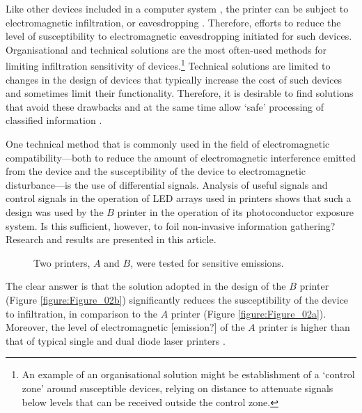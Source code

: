 \documentclass[10pt,a4paper]{article}
\begin{document}
Like other devices included in a computer system \cite{Kuhn2002,Kubiak2016a},
the printer can be subject to electromagnetic infiltration, or eavesdropping
\cite{Ketenci2015a,Kubiak2016b}. Therefore, efforts to reduce the level of
susceptibility to electromagnetic eavesdropping initiated for such devices.
Organisational and technical solutions \cite{Kubiak2006a} are the most
often-used methods for limiting infiltration
sensitivity of devices.\footnote{An example of an organisational solution
might be establishment of a `control zone' around susceptible devices,
relying on distance to attenuate signals below levels that can be received
outside the control zone.} Technical solutions are limited to changes in the
design of devices that typically increase the cost of such devices and
sometimes limit their functionality. Therefore, it is desirable to find
solutions that avoid these drawbacks and at the same time allow `safe'
processing of classified information \cite{Wasfy2011a,Goel2012a}.

One technical method that is commonly used in the field of electromagnetic
compatibility---both to reduce the amount of electromagnetic interference
emitted from the device and the susceptibility of the device to
electromagnetic disturbance---is the use of differential signals. Analysis
of useful signals and control signals \cite{Kubiak2017d} in the operation of
LED arrays
used in printers shows that such a design was used by the $B$ printer in the
operation of its photoconductor exposure system. Is this sufficient, however,
to foil non-invasive information gathering? Research and results are
presented in this article.

\begin{figure*}[!t]
    \centering
    \hfil
    \caption{Two printers, $A$ and $B$, were tested for sensitive emissions.}
    \label{figure:Figure_02}
\end{figure*}

The clear answer is that the solution adopted in the design of the $B$
printer (Figure \ref{figure:Figure_02b}) significantly reduces the
susceptibility of the device to infiltration, in comparison to the $A$
printer (Figure \ref{figure:Figure_02a}). Moreover, the level of
electromagnetic [emission?] of the $A$ printer is higher than that of
typical single and dual diode laser printers \cite{Kubiak2014b}.


\singlespacing



\end{document}
